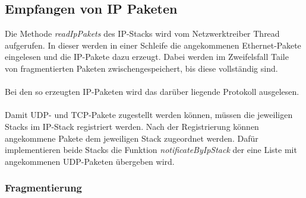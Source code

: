 \subsection{Empfangen von IP Paketen}

Die Methode \textit{readIpPakets} des IP-Stacks wird vom Netzwerktreiber Thread aufgerufen. In dieser werden in einer Schleife die angekommenen Ethernet-Pakete eingelesen und die IP-Pakete dazu erzeugt. Dabei werden im Zweifelsfall Taile von fragmentierten Paketen zwischengespeichert, bis diese vollständig sind. \\\\
Bei den so erzeugten IP-Paketen wird das darüber liegende Protokoll ausgelesen.\\\\
Damit UDP- und TCP-Pakete zugestellt werden können, müssen die jeweiligen Stacks im IP-Stack registriert werden. Nach der Registrierung können angekommene  Pakete dem jeweiligen Stack zugeordnet werden. Dafür implementieren beide Stacks die Funktion \textit{notificateByIpStack} der eine Liste mit angekommenen UDP-Paketen übergeben wird. 

\subsubsection{Fragmentierung}

